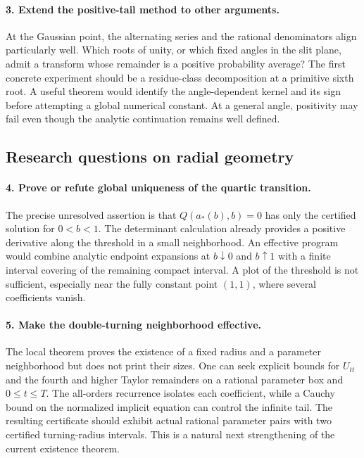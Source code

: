 \paragraph{3. Extend the positive-tail method to other arguments.}
At the Gaussian point, the alternating series and the rational
denominators align particularly well. Which roots of unity, or which
fixed angles in the slit plane, admit a transform whose remainder is
a positive probability average? The first concrete experiment should
be a residue-class decomposition at a primitive sixth root. A useful
theorem would identify the angle-dependent kernel and its sign before
attempting a global numerical constant. At a general angle, positivity
may fail even though the analytic continuation remains well defined.

\subsection{Research questions on radial geometry}

\paragraph{4. Prove or refute global uniqueness of the quartic transition.}
The precise unresolved assertion is that
$Q(a_*(b),b)=0$ has only the certified solution for $0<b<1$.
The determinant calculation already provides a positive derivative
along the threshold in a small neighborhood. An effective program
would combine analytic endpoint expansions at $b\downarrow0$ and
$b\uparrow1$ with a finite interval covering of the remaining compact
interval. A plot of the threshold is not sufficient, especially near
the fully constant point $(1,1)$, where several coefficients vanish.

\paragraph{5. Make the double-turning neighborhood effective.}
The local theorem proves the existence of a fixed radius and a
parameter neighborhood but does not print their sizes. One can seek
explicit bounds for $U_{tt}$ and the fourth and higher Taylor
remainders on a rational parameter box and $0\le t\le T$. The
all-orders recurrence isolates each coefficient, while a Cauchy bound
on the normalized implicit equation can control the infinite tail.
The resulting certificate should exhibit actual rational parameter
pairs with two certified turning-radius intervals. This is a natural
next strengthening of the current existence theorem.

